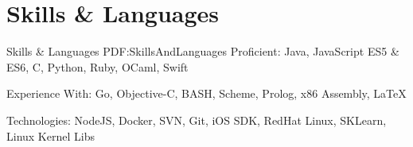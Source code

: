 \section
{Skills \&\newline
Languages}
{Skills \& Languages}
{PDF:SkillsAndLanguages}
\BulletItem
Proficient: Java, JavaScript ES5 \& ES6, C, Python, Ruby, OCaml, Swift

\GapNoBreak
\BulletItem
Experience With: Go, Objective-C, BASH, Scheme, Prolog, x86 Assembly, {\LaTeX}

\GapNoBreak
\BulletItem
Technologies: NodeJS, Docker, SVN, Git, iOS SDK, RedHat Linux, SKLearn, Linux Kernel Libs